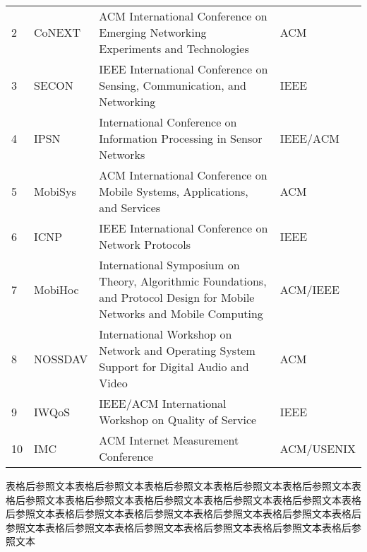 \documentclass[print, doctor, vlined]{DissertUESTC}
\begin{document}
\begin{longtable}{p{2em} p{4.5em} p{20em} p{6em}}
		2 & CoNEXT & ACM International Conference on Emerging Networking Experiments and Technologies & ACM \\
		3 & SECON & IEEE International Conference on Sensing, Communication, and Networking & IEEE \\
		4 & IPSN & International Conference on Information Processing in Sensor Networks & IEEE/ACM \\
		5 & MobiSys & ACM International Conference on Mobile Systems, Applications, and Services & ACM \\
		6 & ICNP & IEEE International Conference on Network Protocols & IEEE\tablenoteref{tn: 手动跨页表格附注标签IEEE} \\
		7 & MobiHoc & International Symposium on Theory, Algorithmic Foundations, and Protocol Design for Mobile Networks and Mobile Computing & ACM/IEEE \\
		8 & NOSSDAV & International Workshop on Network and Operating System Support for Digital Audio and Video & ACM\tablenoteref{tn: 手动跨页表格附注标签ACM} \\
		9 & IWQoS & IEEE/ACM International Workshop on Quality of Service & IEEE \\
		10 & IMC & ACM Internet Measurement Conference & ACM/USENIX \\
		
		
	\end{longtable}

	表格后参照文本表格后参照文本表格后参照文本表格后参照文本表格后参照文本表格后参照文本表格后参照文本表格后参照文本表格后参照文本表格后参照文本表格后参照文本表格后参照文本表格后参照文本表格后参照文本表格后参照文本表格后参照文本表格后参照文本表格后参照文本表格后参照文本表格后参照文本表格后参照文本

	\newpage
\end{document}
